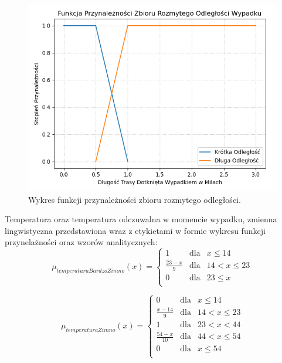 \documentclass{classrep}
\begin{document}
\begin{figure}[h!]
 \centering
 \includegraphics[width=14cm]{FunkcjaPrzynaleznosciOdleglosc.png}
 \vspace{-0.3cm}
 \caption{Wykres funkcji przynależności zbioru rozmytego odległości. }
 \label{rysunek do eksperymentu 1 wariantu 1}
\end{figure}
\newpage

Temperatura oraz temperatura odczuwalna w momencie wypadku, zmienna lingwistyczna przedstawiona wraz z etykietami w formie wykresu funkcji przynelażności oraz wzorów analitycznych:
\begin{equation}
\mu _{temperaturaBardzoZimno}(x) =  \left\{ \begin{array}{rcl}
 1 & \mbox{dla} & x  \leq 14 \\
\frac{23 - x}{9} & \mbox{dla} & 14 < x \leq 23\\
0 & \mbox{dla} & 23 \leq x\\
\end{array}\right.
\end{equation}

\begin{equation}
\mu _{temperaturaZimno}(x) =  \left\{ \begin{array}{rcl}
 0 & \mbox{dla} & x  \leq 14 \\
\frac{x - 14}{9} & \mbox{dla} & 14 < x \leq 23\\
1 & \mbox{dla} & 23 < x < 44\\
\frac{54 - x}{10} & \mbox{dla} & 44 < x \leq 54\\
 0 & \mbox{dla} & x  \leq 54 \\
\end{array}\right.
\end{equation}
\end{document}
